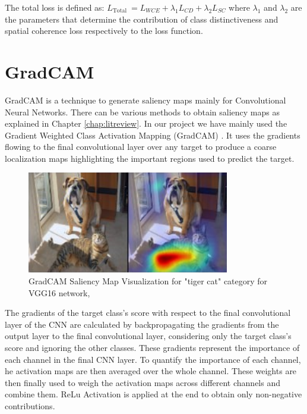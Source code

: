 The total loss is defined as: 
$L_{\text {Total }}=L_{W C E}+\lambda_{1} L_{C D}+\lambda_{2} L_{S C}$ where
$\lambda_{1}$ and $\lambda_{2}$ are the parameters that determine the contribution of class distinctiveness and spatial coherence loss respectively to the loss function.

\section{GradCAM}
GradCAM is a technique to generate saliency maps mainly for Convolutional Neural Networks. There can be various methods to obtain saliency maps as explained in Chapter \ref{chap:litreview}. In our project we have mainly used the Gradient Weighted Class Activation Mapping (GradCAM) \cite{selvaraju2017grad}.
It uses the gradients flowing to the final convolutional layer over any target to produce a coarse localization maps highlighting the important regions used to predict the target.\\
\begin{figure}[!htbp]
  \begin{center}
    \leavevmode
    \ifpdf
      \includegraphics[scale=1]
      {Chapter2/Chapter2Figs/gradcam.png}    
    \fi
    \caption{GradCAM Saliency Map Visualization for "tiger cat" category for VGG16 network, \cite{selvaraju2017grad}}
    \label{gradcam_eg}
  \end{center}
\end{figure}

The gradients of the target class's score with respect to the final convolutional layer of the CNN are calculated by backpropagating the gradients from the output layer to the final convolutional layer, considering only the target class's score and ignoring the other classes. These gradients represent the importance of each channel in the final CNN layer. To quantify the importance of each channel, he activation maps are then averaged over the whole channel. These weights are then finally used to weigh the activation maps across different channels and combine them. ReLu Activation is applied at the end to obtain only non-negative contributions.

